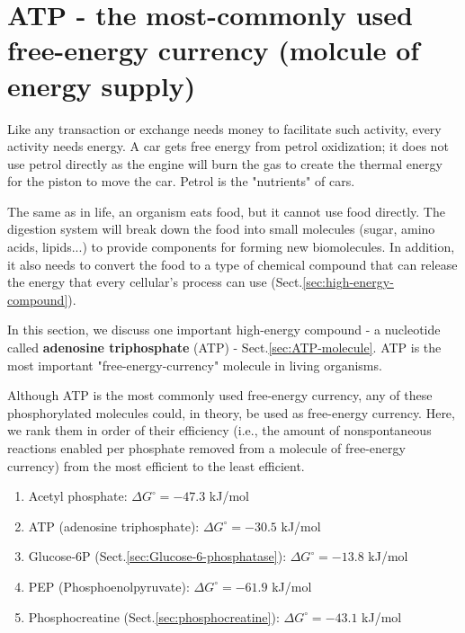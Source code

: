 \section{ATP - the most-commonly used free-energy currency (molcule of energy
supply)}
\label{sec:ATP-overview}
\label{sec:free-energy-currency}


Like any transaction or exchange needs money to facilitate such activity, every
activity needs energy. A car gets free energy from petrol oxidization; it does
not use petrol directly as the engine will burn the gas to create the thermal
energy for the piston to move the car. Petrol is the "nutrients" of cars.

The same as in life, an organism eats food, but it cannot use food directly. The
digestion system will break down the food into small molecules (sugar, amino
acids, lipids...) to provide components for forming new biomolecules. In
addition, it also needs to convert the food to a type of chemical compound that
can release the energy that every cellular's process can use
(Sect.\ref{sec:high-energy-compound}).

In this section, we discuss one important high-energy compound - a nucleotide
called {\bf adenosine triphosphate} (ATP) - Sect.\ref{sec:ATP-molecule}.
ATP is the most important "free-energy-currency" molecule in living organisms.

Although ATP is the most commonly used free-energy currency, any of these
phosphorylated molecules could, in theory, be used as free-energy currency.
Here, we rank them  in order of their efficiency (i.e., the amount of
nonspontaneous reactions enabled per phosphate removed from a molecule of
free-energy currency) from the most efficient to the least efficient.
\begin{enumerate}
  \item Acetyl phosphate: $\Delta G^\circ = -47.3 $ kJ/mol
  \item ATP (adenosine triphosphate): $\Delta G^\circ = -30.5$ kJ/mol
  \item Glucose-6P (Sect.\ref{sec:Glucose-6-phosphatase}):
  $\Delta G^\circ =-13.8 $ kJ/mol

  \item PEP (Phosphoenolpyruvate): $\Delta G^\circ = -61.9$ kJ/mol
  
  \item Phosphocreatine (Sect.\ref{sec:phosphocreatine}):
  $\Delta G^\circ =  -43.1$ kJ/mol
\end{enumerate}


